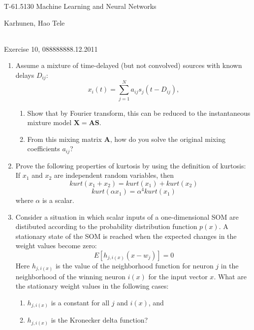 \documentclass[10pt]{article}
\begin{document}
\pagestyle{empty}
\begin{Large}
\begin{bf} 
T-61.5130 Machine Learning and Neural Networks\\ 
\end{bf}
\end{Large}
Karhunen, Hao Tele\\  
\\
\begin{large}
\begin{bf}
Exercise 10,  088888888.12.2011
\end{bf}
\end{large}
\begin{enumerate}


\item Assume a mixture of time-delayed (but not convolved) sources with known delays $D_{ij}$:
\begin{displaymath}
  x_i(t) = \sum_{j=1}^N a_{ij}s_j(t-D_{ij}),
\end{displaymath}
\begin{enumerate}
\item Show that by Fourier transform, this can be reduced to the instantaneous mixture
  model $\mathbf{X} = \mathbf{A} \mathbf{S}$.
\item From this mixing matrix $\mathbf{A}$, how do you solve the original mixing
  coefficients $a_{ij}$?
\end{enumerate}


\vspace{2mm}

\item Prove the following properties of kurtosis by using the definition of kurtosis:
  If $x_1$ and $x_2$ are independent random variables, then
  \begin{displaymath}
    kurt(x_1 + x_2) = kurt(x_1) + kurt(x_2)
  \end{displaymath}
  \begin{displaymath}
    kurt(\alpha x_1) = \alpha^4 kurt(x_1)
  \end{displaymath}
  where $\alpha$ is a scalar.
  

\vspace{2mm}

\item Consider a situation in which scalar inputs of a
one-dimensional SOM are distibuted according to the probability
distribution function $p(x)$. A stationary state
of the SOM is reached when the expected changes in the weight
values become zero:
\begin{equation*}
E[h_{j,i(x)}(x-w_j)]=0
\end{equation*}
Here $h_{j,i(x)}$ is the value of the neighborhood function for neuron $j$ in the neighborhood
of the winning neuron $i(x)$ for the input vector $x$.
What are the stationary weight values in the following cases: \begin{enumerate}
\item $h_{j,i(x)}$ is a constant for all $j$ and $i(x)$, and
\item $h_{j,i(x)}$ is the Kronecker delta function?
\end{enumerate}


\end{enumerate}
\end{document}

